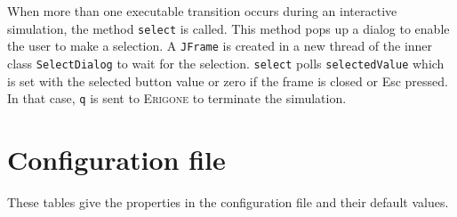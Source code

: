 \documentclass[11pt]{article}
\newcommand{\eri}{\textsc{Erigone}}
\newcommand{\p}[1]{\texttt{#1}}
\newcommand{\bu}[1]{\textsf{#1}}
\begin{document}
When more than one executable transition occurs during an interactive
simulation, the method \p{select} is called. This method pops up a
dialog to enable the user to make a selection. A \p{JFrame} is created
in a new thread of the inner class \p{SelectDialog} to wait for the
selection. \p{select} polls \p{selectedValue} which is set with the
selected button value or zero if the frame is closed or \bu{Esc}
pressed. In that case, \p{q} is sent to \eri{} to terminate the
simulation.

\newpage

\appendix

\section{Configuration file}\label{a.cfg}

These tables give the properties in the configuration file and their
default values.
\end{document}
